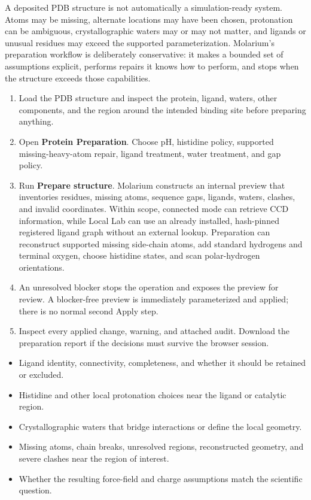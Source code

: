 
A deposited PDB structure is not automatically a simulation-ready system. Atoms may be missing, alternate locations may have been chosen, protonation can be ambiguous, crystallographic waters may or may not matter, and ligands or unusual residues may exceed the supported parameterization. Molarium's preparation workflow is deliberately conservative: it makes a bounded set of assumptions explicit, performs repairs it knows how to perform, and stops when the structure exceeds those capabilities.


\begin{enumerate}
\item Load the PDB structure and inspect the protein, ligand, waters, other components, and the region around the intended binding site before preparing anything.
\item Open \textbf{Protein Preparation}. Choose pH, histidine policy, supported missing-heavy-atom repair, ligand treatment, water treatment, and gap policy.
\item Run \textbf{Prepare structure}. Molarium constructs an internal preview that inventories residues, missing atoms, sequence gaps, ligands, waters, clashes, and invalid coordinates. Within scope, connected mode can retrieve CCD information, while Local Lab can use an already installed, hash-pinned registered ligand graph without an external lookup. Preparation can reconstruct supported missing side-chain atoms, add standard hydrogens and terminal oxygen, choose histidine states, and scan polar-hydrogen orientations.
\item An unresolved blocker stops the operation and exposes the preview for review. A blocker-free preview is immediately parameterized and applied; there is no normal second Apply step.
\item Inspect every applied change, warning, and attached audit. Download the preparation report if the decisions must survive the browser session.
\end{enumerate}


\begin{itemize}
\item Ligand identity, connectivity, completeness, and whether it should be retained or excluded.
\item Histidine and other local protonation choices near the ligand or catalytic region.
\item Crystallographic waters that bridge interactions or define the local geometry.
\item Missing atoms, chain breaks, unresolved regions, reconstructed geometry, and severe clashes near the region of interest.
\item Whether the resulting force-field and charge assumptions match the scientific question.
\end{itemize}

